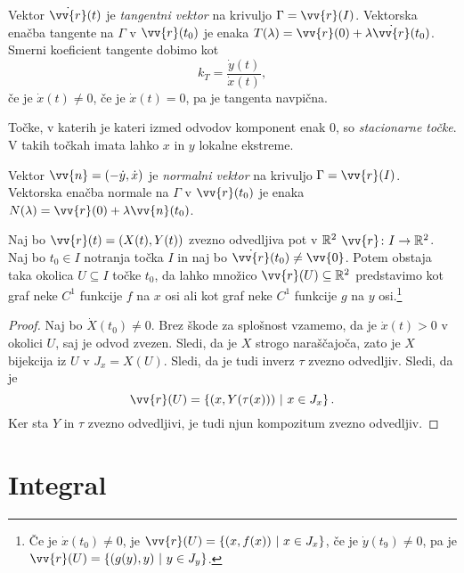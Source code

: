 \documentclass[12pt, a4paper]{article}
\begin{document}
\begin{definicija}
Vektor $\dot{\vv{r}}(t)$ je \emph{tangentni vektor} na krivuljo $\Gamma=\vv{r}(I)$. Vektorska enačba tangente na $\Gamma$ v $\vv{r}(t_0)$ je enaka $T(\lambda)=\vv{r}(0)+\lambda\dot{\vv{r}}(t_0)$. Smerni koeficient tangente dobimo kot
\[
k_T=\frac{\dot{y}(t)}{\dot{x}(t)},
\]
če je $\dot{x}(t)\ne 0$, če je $\dot{x}(t)=0$, pa je tangenta navpična.
\end{definicija}

\begin{definicija}
Točke, v katerih je kateri izmed odvodov komponent enak $0$, so \emph{stacionarne točke}. V takih točkah imata lahko $x$ in $y$ lokalne ekstreme.
\end{definicija}

\begin{definicija}
Vektor $\vv{n}=(-\dot{y},\dot{x})$ je \emph{normalni vektor} na krivuljo $\Gamma=\vv{r}(I)$. Vektorska enačba normale na $\Gamma$ v $\vv{r}(t_0)$ je enaka $N(\lambda)=\vv{r}(0)+\lambda\vv{n}(t_0)$.
\end{definicija}

\begin{izrek}
Naj bo $\vv{r}(t)=\left(X(t),Y(t)\right)$ zvezno odvedljiva pot v $\mathbb{R}^2$ $\vv{r}\colon I\to\R^2$. Naj bo $t_0\in I$ notranja točka $I$ in naj bo $\dot{\vv{r}}(t_0)\ne\vv{0}$. Potem obstaja taka okolica $U\subseteq I$ točke $t_0$, da lahko množico $\vv{r}(U)\subseteq\R^2$ predstavimo kot graf neke $C^1$ funkcije $f$ na $x$ osi ali kot graf neke $C^1$ funkcije $g$ na $y$ osi.\footnote{Če je $\dot{x}(t_0)\ne 0$, je $\vv{r}(U)=\setb{(x,f(x))}{x\in J_x}$, če je $\dot{y}(t_9)\ne 0$, pa je $\vv{r}(U)=\setb{(g(y),y)}{y\in J_y}$.}
\end{izrek}

\begin{proof}
Naj bo $\dot{X}(t_0)\ne 0$. Brez škode za splošnost vzamemo, da je $\dot{x}(t)>0$ v okolici $U$, saj je odvod zvezen. Sledi, da je $X$ strogo naraščajoča, zato je $X$ bijekcija iz $U$ v $J_x=X(U)$. Sledi, da je tudi inverz $\tau$ zvezno odvedljiv. Sledi, da je
\[
\vv{r}(U)=\setb{\left(x,Y(\tau(x))\right)}{x\in J_x}.
\]
Ker sta $Y$ in $\tau$ zvezno odvedljivi, je tudi njun kompozitum zvezno odvedljiv.
\end{proof}

\newpage

\section{Integral}
\end{document}
